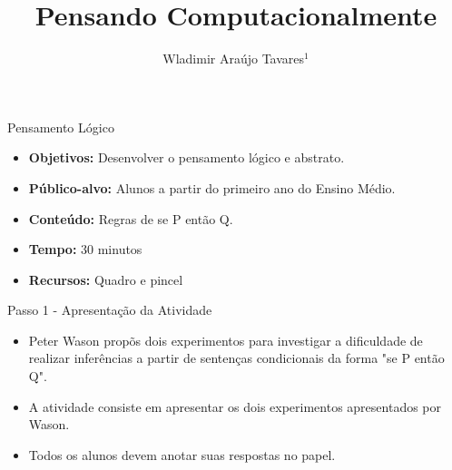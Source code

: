 \documentclass{beamer}
\title {Pensando Computacionalmente}
\author[Wladimir Araújo Tavares]{ Wladimir Araújo Tavares$^{1}$  }
\institute[UFC]{$^{1}$Universidade Federal do Ceará - Campus de Quixadá\\}
\date{}
\begin{document}
\begin{frame}
	\titlepage
\end{frame}




\begin{frame}{Pensamento Lógico}

\begin{itemize}
\item \textbf{Objetivos:} Desenvolver o pensamento lógico e abstrato.

\item \textbf{Público-alvo:}  Alunos a partir do primeiro ano do Ensino Médio.

\item \textbf{Conteúdo:} Regras de se P então Q.

\item \textbf{Tempo:} 30 minutos

\item \textbf{Recursos:} Quadro e pincel

\end{itemize}
    
\end{frame}




\begin{frame}{Passo 1 - Apresentação da Atividade}

\begin{itemize}
   
\item Peter Wason  propõs dois experimentos para investigar a dificuldade de realizar inferências a partir de sentenças condicionais da forma "se P então Q".

\item A atividade consiste em apresentar os dois experimentos apresentados por Wason. 

\item Todos os alunos devem anotar suas respostas no papel.

\end{itemize}

\end{frame}
\end{document}
